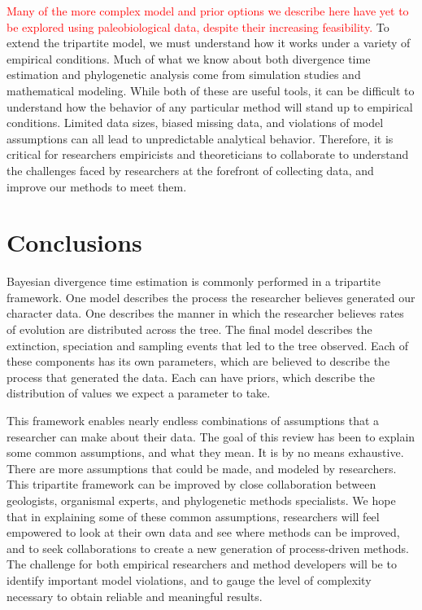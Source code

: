 \documentclass[11pt]{article}
\newcommand{\edit}[1]{{\textcolor{red}{#1}}} %
\begin{document}
\edit{Many of the more complex model and prior options we describe here have yet to be explored using paleobiological data, despite their increasing feasibility.}
To extend the tripartite model, we must understand how it works under a variety of empirical conditions.
Much of what we know about both divergence time estimation and phylogenetic analysis come from simulation studies and mathematical modeling.
While both of these are useful tools, it can be difficult to understand how the behavior of any particular method will stand up to empirical conditions.
Limited data sizes, biased missing data, and violations of model assumptions can all lead to unpredictable analytical behavior.
Therefore, it is critical for researchers empiricists and theoreticians to collaborate to understand the challenges faced by researchers at the forefront of collecting data, and improve our methods to meet them.


\section{Conclusions}

Bayesian divergence time estimation is commonly performed in a tripartite framework.
One model describes the process the researcher believes generated our character data.
One describes the manner in which the researcher believes rates of evolution are distributed across the tree.
The final model describes the extinction, speciation and sampling events that led to the tree observed.
Each of these components has its own parameters, which are believed to describe the process that generated the data.
Each can have priors, which describe the distribution of values we expect a parameter to take.


This framework enables nearly endless combinations of assumptions that a researcher can make about their data.
The goal of this review has been to explain some common assumptions, and what they mean. 
It is by no means exhaustive.
There are more assumptions that could be made, and modeled by researchers.
This %
tripartite framework can be improved by close collaboration between geologists, organismal experts, and phylogenetic methods specialists. 
We hope that in explaining some of these common assumptions, researchers will feel empowered to look at their own data and see where methods can be improved, and to seek collaborations to create a new generation of process-driven methods. The challenge for both empirical researchers and method developers will be to identify important model violations, and to gauge the level of complexity necessary to obtain reliable and meaningful results.
\end{document}
